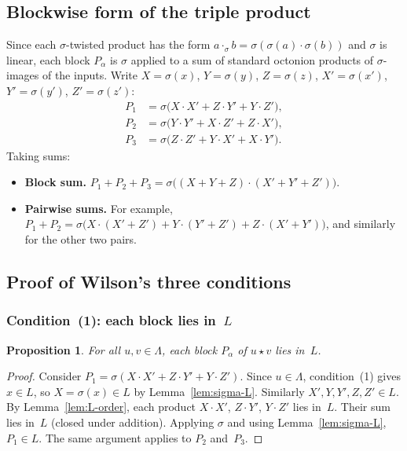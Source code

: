 \documentclass[twoside,english]{paper}
\numberwithin{equation}{section}
\numberwithin{figure}{section}
\newtheorem{proposition}[theorem]{Proposition}
\theoremstyle{definition}
\theoremstyle{remark}
\newcommand{\LL}{\Lambda}             %
\begin{document}
\subsection{Blockwise form of the triple product}

Since each $\sigma$-twisted product has the form
$a \cdot_\sigma b = \sigma(\sigma(a) \cdot \sigma(b))$ and $\sigma$
is linear, each block $P_\alpha$ is $\sigma$ applied to a sum of
standard octonion products of $\sigma$-images of the inputs.
Write $X = \sigma(x)$, $Y = \sigma(y)$, $Z = \sigma(z)$,
$X' = \sigma(x')$, $Y' = \sigma(y')$, $Z' = \sigma(z')$:
\begin{align}
  P_1 &= \sigma\bigl(X \cdot X' + Z \cdot Y' + Y \cdot Z'\bigr),
  \label{eq:P1-std} \\
  P_2 &= \sigma\bigl(Y \cdot Y' + X \cdot Z' + Z \cdot X'\bigr),
  \label{eq:P2-std} \\
  P_3 &= \sigma\bigl(Z \cdot Z' + Y \cdot X' + X \cdot Y'\bigr).
  \label{eq:P3-std}
\end{align}
Taking sums:
\begin{itemize}
\item \textbf{Block sum.}
  $P_1 + P_2 + P_3 = \sigma\bigl((X+Y+Z) \cdot (X'+Y'+Z')\bigr)$.
\item \textbf{Pairwise sums.}  For example,
  $P_1 + P_2 = \sigma\bigl(X \cdot (X'+Z') + Y \cdot (Y'+Z') +
  Z \cdot (X'+Y')\bigr)$, and similarly for the other two pairs.
\end{itemize}

\subsection{Proof of Wilson's three conditions}

\subsubsection{Condition~(1): each block lies in~\texorpdfstring{$L$}{L}}

\begin{proposition}\label{prop:cond1}
For all $u, v \in \LL$, each block $P_\alpha$ of $u \star v$ lies
in~$L$.
\end{proposition}

\begin{proof}
Consider $P_1 = \sigma(X \cdot X' + Z \cdot Y' + Y \cdot Z')$.
Since $u \in \LL$, condition~(1) gives $x \in L$, so
$X = \sigma(x) \in L$ by Lemma~\ref{lem:sigma-L}.  Similarly
$X', Y, Y', Z, Z' \in L$.
By Lemma~\ref{lem:L-order}, each product $X \cdot X'$, $Z \cdot Y'$,
$Y \cdot Z'$ lies in~$L$.  Their sum lies in~$L$ (closed under
addition).  Applying $\sigma$ and using Lemma~\ref{lem:sigma-L},
$P_1 \in L$.  The same argument applies to
$P_2$ and~$P_3$.
\end{proof}
\end{document}
